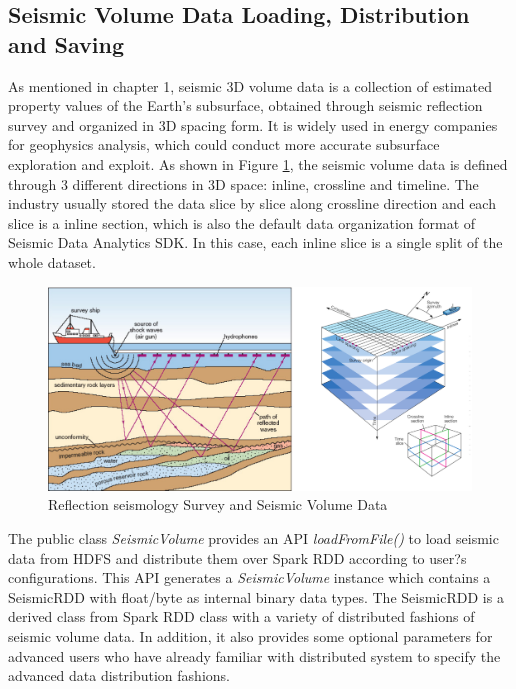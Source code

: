 \subsection{Seismic Volume Data Loading, Distribution and Saving}

As mentioned in chapter 1, seismic 3D volume data is a collection of estimated property values of the Earth's subsurface, obtained through seismic reflection survey and organized in 3D spacing form. It is widely used in energy companies for geophysics analysis, which could conduct more accurate subsurface exploration and exploit. As shown in Figure \ref{seisdata}, the seismic volume data is defined through 3 different directions in 3D space: inline, crossline and timeline. The industry usually stored the data slice by slice along crossline direction and each slice is a inline section, which is also the default data organization format of Seismic Data Analytics SDK. In this case, each inline slice is a single split of the whole dataset.

\begin{figure}[h]
\centering
\includegraphics[scale=0.6]{figures/seisdata.png}
\caption{Reflection seismology Survey and Seismic Volume Data \cite{seisaov} \cite{seisinline}}
\label{seisdata}
\end{figure}

The public class \emph{SeismicVolume} provides an API \emph{loadFromFile()} to load seismic data from HDFS and distribute them over Spark RDD according to user?s configurations. This API generates a \emph{SeismicVolume} instance which contains a SeismicRDD with float/byte as internal binary data types. The SeismicRDD is a derived class from Spark RDD class with a variety of distributed fashions of seismic volume data. In addition, it also provides some optional parameters for advanced users who have already familiar with distributed system to specify the advanced data distribution fashions. 


